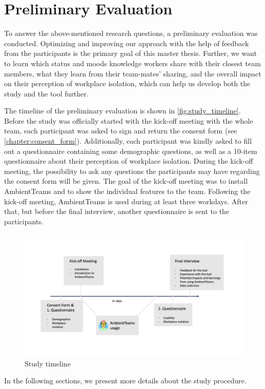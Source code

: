 \chapter{Preliminary Evaluation}
\label{chapter:preliminary_evaluation}
To answer the above-mentioned research questions, a preliminary evaluation was conducted. Optimizing and improving our approach with the help of feedback from the participants is the primary goal of this master thesis. Further, we want to learn which status and moods knowledge workers share with their closest team members, what they learn from their team-mates' sharing, and the overall impact on their perception of workplace isolation, which can help us develop both the study and the tool further.

The timeline of the preliminary evaluation is shown in \autoref{fig:study_timeline}. Before the study was officially started with the kick-off meeting with the whole team, each participant was asked to sign and return the consent form (see \autoref{chapter:consent_form}). Additionally, each participant was kindly asked to fill out a questionnaire containing some demographic questions, as well as a 10-item questionnaire about their perception of workplace isolation. During the kick-off meeting, the possibility to ask any questions the participants may have regarding the consent form will be given. The goal of the kick-off meeting was to install AmbientTeams and to show the individual features to the team. Following the kick-off meeting, AmbientTeams is used during at least three workdays. After that, but before the final interview, another questionnaire is sent to the participants.

\begin{figure}[h]
    \centering
    \includegraphics[width=.8\linewidth]{./images/Study_Timeline.png}
    \caption{Study timeline}
    \label{fig:study_timeline}
\end{figure}

In the following sections, we present more details about the study procedure.

